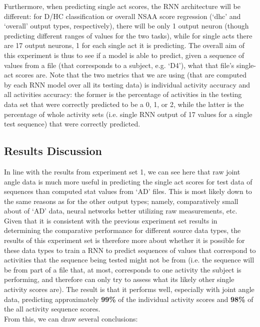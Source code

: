 \documentclass[12pt,twoside]{report}
\begin{document}
\quad Furthermore, when predicting single act scores, the RNN architecture will be different: for D/HC classification or overall NSAA score regression (‘dhc’ and ‘overall’ output types, respectively), there will be only 1 output neuron (though predicting different ranges of values for the two tasks), while for single acts there are 17 output neurons, 1 for each single act it is predicting. The overall aim of this experiment is thus to see if a model is able to predict, given a sequence of values from a file (that corresponds to a subject, e.g. ‘D4’), what that file’s single-act scores are. Note that the two metrics that we are using (that are computed by each RNN model over all its testing data) is individual activity accuracy and all activities accuracy: the former is the percentage of activities in the testing data set that were correctly predicted to be a 0, 1, or 2, while the latter is the percentage of whole activity sets (i.e. single RNN output of 17 values for a single test sequence) that were correctly predicted. 

\subsection{Results Discussion}

\quad In line with the results from experiment set 1, we can see here that raw joint angle data is much more useful in predicting the single act scores for test data of sequences than computed stat values from ‘AD’ files. This is most likely down to the same reasons as for the other output types; namely, comparatively small about of ‘AD’ data, neural networks better utilizing raw measurements, etc. Given that it is consistent with the previous experiment set results in determining the comparative performance for different source data types, the results of this experiment set is therefore more about whether it is possible for these data types to train a RNN to predict sequences of values that correspond to activities that the sequence being tested might not be from (i.e. the sequence will be from part of a file that, at most, corresponds to one activity the subject is performing, and therefore can only try to assess what its likely other single activity scores are). The result is that it performs well, especially with joint angle data, predicting approximately \textbf{99\%} of the individual activity scores and \textbf{98\%} of the all activity sequence scores.\\

\quad From this, we can draw several conclusions:
\end{document}

